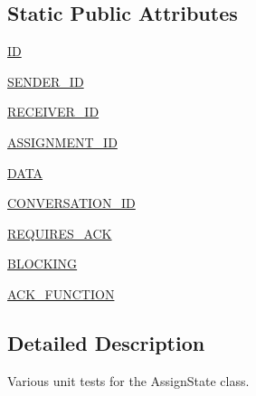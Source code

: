 \subsection*{Static Public Attributes}
\begin{DoxyCompactItemize}
\item 
\hyperlink{classparlai_1_1mturk_1_1core_1_1legacy__2018_1_1test_1_1test__socket__manager_1_1TestPacket_a3355d540f1d97bf5c5a37815e9e2b17f}{ID}
\item 
\hyperlink{classparlai_1_1mturk_1_1core_1_1legacy__2018_1_1test_1_1test__socket__manager_1_1TestPacket_a76ae545906be9ef92ebd80ad9a2dc72d}{S\+E\+N\+D\+E\+R\+\_\+\+ID}
\item 
\hyperlink{classparlai_1_1mturk_1_1core_1_1legacy__2018_1_1test_1_1test__socket__manager_1_1TestPacket_a9785184d24f10a1b6c737f1c3e6f0455}{R\+E\+C\+E\+I\+V\+E\+R\+\_\+\+ID}
\item 
\hyperlink{classparlai_1_1mturk_1_1core_1_1legacy__2018_1_1test_1_1test__socket__manager_1_1TestPacket_ad7b8c7eb326a4fe486d3164e92397343}{A\+S\+S\+I\+G\+N\+M\+E\+N\+T\+\_\+\+ID}
\item 
\hyperlink{classparlai_1_1mturk_1_1core_1_1legacy__2018_1_1test_1_1test__socket__manager_1_1TestPacket_a8531abf0ddfd83624318d8db515faeeb}{D\+A\+TA}
\item 
\hyperlink{classparlai_1_1mturk_1_1core_1_1legacy__2018_1_1test_1_1test__socket__manager_1_1TestPacket_a062524e6afba7e28f55e2ea6267bf34b}{C\+O\+N\+V\+E\+R\+S\+A\+T\+I\+O\+N\+\_\+\+ID}
\item 
\hyperlink{classparlai_1_1mturk_1_1core_1_1legacy__2018_1_1test_1_1test__socket__manager_1_1TestPacket_a28b17b4edaa09b55d5ebddde73564ac0}{R\+E\+Q\+U\+I\+R\+E\+S\+\_\+\+A\+CK}
\item 
\hyperlink{classparlai_1_1mturk_1_1core_1_1legacy__2018_1_1test_1_1test__socket__manager_1_1TestPacket_a284d02875bc0a2e1ae1dec3e1298b030}{B\+L\+O\+C\+K\+I\+NG}
\item 
\hyperlink{classparlai_1_1mturk_1_1core_1_1legacy__2018_1_1test_1_1test__socket__manager_1_1TestPacket_ab4705a7e3a11744db8dac81486732068}{A\+C\+K\+\_\+\+F\+U\+N\+C\+T\+I\+ON}
\end{DoxyCompactItemize}


\subsection{Detailed Description}
\begin{DoxyVerb}Various unit tests for the AssignState class.
\end{DoxyVerb}
 

